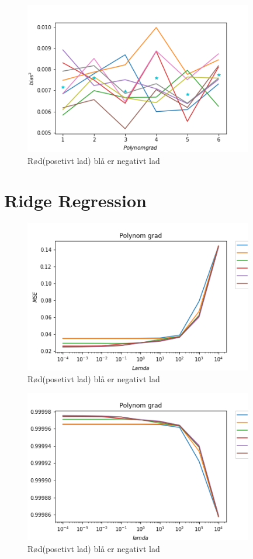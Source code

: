 \documentclass[norsk,a4paper,12pt]{article}
\begin{document}
\begin{figure}[H]
\includegraphics[width=100mm]{Bias}
\caption{Rød(posetivt lad)  blå er negativt lad  }
\end{figure}


\section*{ Ridge Regression}
\begin{figure}[H]
\includegraphics[width=100mm]{MSE(R)}
\caption{Rød(posetivt lad)  blå er negativt lad  }
\end{figure}


\begin{figure}[H]
\includegraphics[width=100mm]{r2(R)}
\caption{Rød(posetivt lad)  blå er negativt lad  }
\end{figure}
\end{document}
